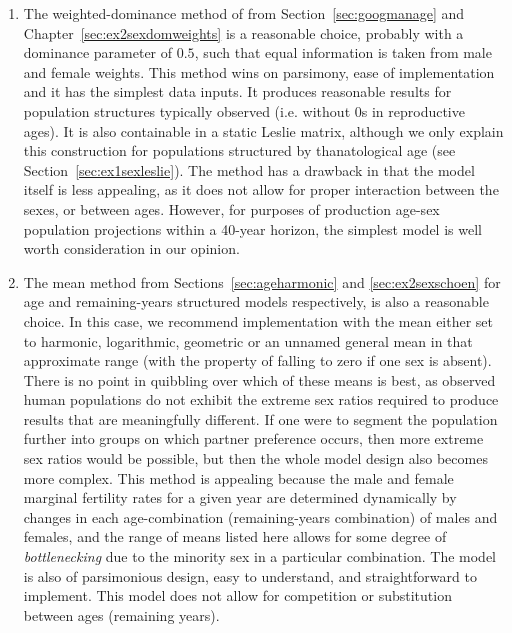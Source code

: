 \begin{enumerate}
\item The weighted-dominance method of \citet{goodman1967age} from
Section~\ref{sec:googmanage} and Chapter~\ref{sec:ex2sexdomweights} is a
reasonable choice, probably with a dominance parameter of $0.5$, 
such that equal information is taken from male and female
weights. This method wins on parsimony, ease of implementation and it has the
simplest data inputs. It produces reasonable results for population
structures typically observed (i.e. without 0s in reproductive ages). It is also 
containable in a static Leslie matrix, although
we only explain this construction for populations structured by
thanatological age (see Section~\ref{sec:ex1sexleslie}). The method has a
drawback in that the model itself is less appealing, as it does not allow 
for proper interaction between the sexes, or
between ages. However, for purposes of production age-sex population projections
within a 40-year horizon, the simplest model is well worth consideration in our opinion.

\item The mean method from Sections~\ref{sec:ageharmonic} and
\ref{sec:ex2sexschoen} for age and remaining-years structured models
respectively, is also a reasonable choice. In this case, we recommend
implementation with the mean either set to harmonic, logarithmic, geometric or
an unnamed general mean in that approximate range (with the property of 
falling to zero if one sex is absent). There is no point in
quibbling over which of these means is best, as observed human populations do
not exhibit the extreme sex ratios required to produce results that are
meaningfully different. If one were to segment the population further into
groups on which partner preference occurs, then more extreme sex ratios would
be possible, but then the whole model design also becomes more complex. This
method is appealing because the male and female marginal fertility rates 
for a given year are determined dynamically by changes in each 
age-combination (remaining-years combination) of males and females, and the
range of means listed here allows for some degree of \textit{bottlenecking} due
to the minority sex in a particular combination. The model is also of
parsimonious design, easy to understand, and straightforward to implement. This
model does not allow for competition or substitution between ages (remaining
years).


\end{enumerate}
